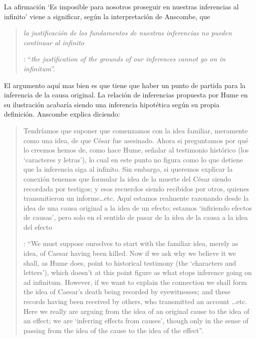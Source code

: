 La afirmación \enquote*{Es imposible para nosotros proseguir en nuestras inferencias al infinito} viene a significar, según la interpretación de Anscombe, que \blockquote[{\Cite[Cf.][87]{anscombe1981parmenides:humeandjulius}}: \enquote{\emph{the justification of the grounds of our inferences cannot go on in infinitum}}.]{\emph{la justificación de los fundamentos de nuestras inferencias no pueden continuar al infinito}}. El argumento aquí mas bien es que tiene que haber un punto de partida para la inferencia de la causa original. La relación de inferencias propuesta por Hume en su ilustración acabaría siendo una inferencia hipotética según su propia definición. Anscombe explica diciendo: \blockquote[{\Cite[117]{anscombe2011plato:humecaus}}: \enquote{We must suppose ourselves to start with the familiar idea, merely as idea, of Caesar having been killed. Now if we ask why we believe it we shall, as Hume does, point to historical testimony (the ‘characters and letters’), which doesn’t at this point figure as what stops inference going on ad infinitum. However, if we want to explain the connection we shall form the idea of Caesar’s death being recorded by eyewitnesses; and these records having been received by others, who transmitted an account \ldots etc. Here we really are arguing from the idea of an original cause to the idea of an effect; we are ‘inferring effects from causes’, though only in the sense of passing from the idea of the cause to the idea of the effect}.]{Tendríamos que suponer que comenzamos con la idea familiar, meramente como una idea, de que César fue asesinado. Ahora si preguntamos por qué lo creemos hemos de, como hace Hume, señalar al testimonio histórico (los `caracteres y letras'), lo cual en este punto no figura como lo que detiene que la inferencia siga al infinito. Sin embargo, si queremos explicar la conexión tenemos que formular la idea de la muerte del César siendo recordada por testigos; y esos recuerdos siendo recibidos por otros, quienes transmitieron un informe\ldots etc. Aquí estamos realmente razonando desde la idea de una causa original a la idea de un efecto; estamos `infiriendo efectos de causas', pero solo en el sentido de pasar de la idea de la causa a la idea del efecto}.

